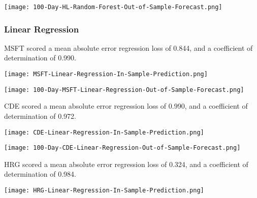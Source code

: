 \begin{center}  
    \texttt{[image: 100-Day-HL-Random-Forest-Out-of-Sample-Forecast.png]}
    \label{fig:nonfloat}
\end{center}

\subsubsection{Linear Regression}
MSFT scored a mean absolute error regression loss of 0.844, and a coefficient of determination of 0.990.

\begin{center}
    \texttt{[image: MSFT-Linear-Regression-In-Sample-Prediction.png]}
    \label{fig:nonfloat}
\end{center}

\begin{center}  
    \texttt{[image: 100-Day-MSFT-Linear-Regression-Out-of-Sample-Forecast.png]}
    \label{fig:nonfloat}
\end{center}

CDE scored a mean absolute error regression loss of 0.990, and a coefficient of determination of 0.972.

\begin{center}
    \texttt{[image: CDE-Linear-Regression-In-Sample-Prediction.png]}
    \label{fig:nonfloat}
\end{center}

\begin{center}  
    \texttt{[image: 100-Day-CDE-Linear-Regression-Out-of-Sample-Forecast.png]}
    \label{fig:nonfloat}
\end{center}

HRG scored a mean absolute error regression loss of 0.324, and a coefficient of determination of 0.984.

\begin{center}
    \texttt{[image: HRG-Linear-Regression-In-Sample-Prediction.png]}
    \label{fig:nonfloat}
\end{center}

